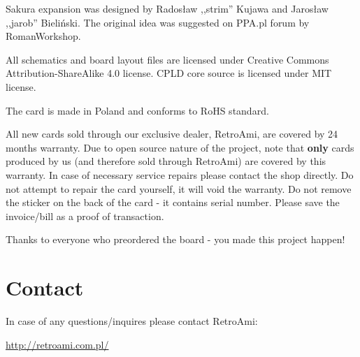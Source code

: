 \documentclass[10pt,a4paper]{article}
\begin{document}
Sakura expansion was designed by Radosław ,,strim'' Kujawa and Jarosław ,,jarob'' Bieliński. The original idea was suggested on PPA.pl forum by RomanWorkshop. 

All schematics and board layout files are licensed under Creative Commons Attribution-ShareAlike 4.0 license. CPLD core source is licensed under MIT license.

The card is made in Poland and conforms to RoHS standard. 

All new cards sold through our exclusive dealer, RetroAmi, are covered by 24 months warranty. Due to open source nature of the project, note that {\bf only} cards produced by us (and therefore sold through RetroAmi) are covered by this warranty. In case of necessary service repairs please contact the shop directly. Do not attempt to repair the card yourself, it will void the warranty. Do not remove the sticker on the back of the card - it contains serial number. Please save the invoice/bill as a proof of transaction.

Thanks to everyone who preordered the board - you made this project happen!

\section*{Contact}

In case of any questions/inquires please contact RetroAmi:

\url{http://retroami.com.pl/} 
\end{document}
